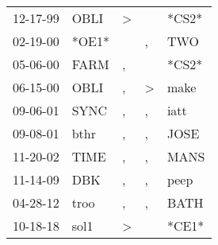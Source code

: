 \begin{supertabular}{lllll}
 12-17-99 &   OBLI &  \textgreater &               &  *CS2* \\
 02-19-00 &  *OE1* &               &             , &    TWO \\
 05-06-00 &   FARM &             , &               &  *CS2* \\
 06-15-00 &   OBLI &             , &  \textgreater &   make \\
 09-06-01 &   SYNC &             , &             , &   iatt \\
 09-08-01 &   bthr &             , &             , &   JOSE \\
 11-20-02 &   TIME &             , &             , &   MANS \\
 11-14-09 &    DBK &             , &             , &   peep \\
 04-28-12 &   troo &             , &             , &   BATH \\
 10-18-18 &   sol1 &  \textgreater &               &  *CE1* \\
\end{supertabular}
